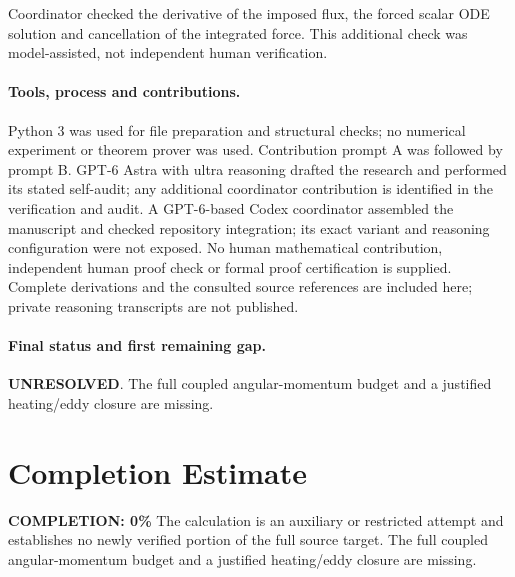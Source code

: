 \documentclass[11pt]{article}
\begin{document}
Coordinator checked the derivative of the imposed flux, the forced scalar ODE solution and cancellation of the integrated force. This additional check was model-assisted, not independent human verification.

\paragraph{Tools, process and contributions.}
Python 3 was used for file preparation and structural checks; no numerical experiment or theorem prover was used. Contribution prompt A was followed by prompt B. GPT-6 Astra with ultra reasoning drafted the research and performed its stated self-audit; any additional coordinator contribution is identified in the verification and audit. A GPT-6-based Codex coordinator assembled the manuscript and checked repository integration; its exact variant and reasoning configuration were not exposed. No human mathematical contribution, independent human proof check or formal proof certification is supplied. Complete derivations and the consulted source references are included here; private reasoning transcripts are not published.

\paragraph{Final status and first remaining gap.}
\textbf{UNRESOLVED}. The full coupled angular-momentum budget and a justified heating/eddy closure are missing.

\section{Completion Estimate}
\noindent\textbf{COMPLETION: 0\%}
The calculation is an auxiliary or restricted attempt and establishes no newly verified portion of the full source target. The full coupled angular-momentum budget and a justified heating/eddy closure are missing.
\end{document}
